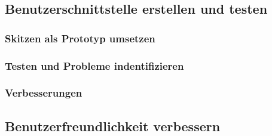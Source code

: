 \documentclass[10pt]{article}
\begin{document}
	\subsection{Benutzerschnittstelle erstellen und testen}
	\subsubsection{Skitzen als Prototyp umsetzen}
	\subsubsection{Testen und Probleme indentifizieren}
	\subsubsection{Verbesserungen}
	\subsection{Benutzerfreundlichkeit verbessern}
	
	
\end{document}
